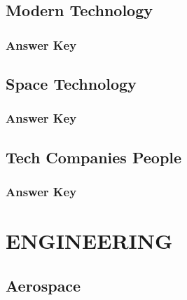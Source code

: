 \documentclass[12pt,a4paper]{book}
\newcounter{totalcounter}
\begin{document}


\setcounter{totalcounter}{1}

\section{Modern Technology}



\subsection*{Answer Key}



\setcounter{totalcounter}{1}

\section{Space Technology}



\subsection*{Answer Key}



\setcounter{totalcounter}{1}

\section{Tech Companies People}



\subsection*{Answer Key}



\chapter{ENGINEERING}

\setcounter{totalcounter}{1}

\section{Aerospace}
\end{document}
